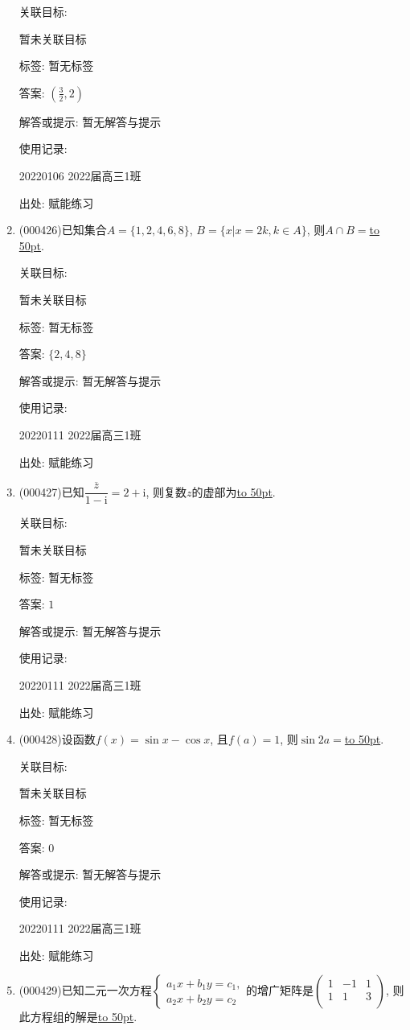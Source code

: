 \documentclass[10pt,a4paper]{article}
\newcommand{\blank}[1]{\underline{\hbox to #1pt{}}}
\begin{document}
\begin{enumerate}[1.]
关联目标:

暂未关联目标



标签: 暂无标签

答案: $(\frac 32,2)$

解答或提示: 暂无解答与提示

使用记录:

20220106	2022届高三1班	


出处: 赋能练习
\item { (000426)}已知集合$A=\{1,2,4,6,8\}$, $B=\{x|x=2k,k\in A\}$, 则$A\cap B=$\blank{50}.


关联目标:

暂未关联目标



标签: 暂无标签

答案: $\{2,4,8\}$

解答或提示: 暂无解答与提示

使用记录:

20220111	2022届高三1班	


出处: 赋能练习
\item { (000427)}已知$\dfrac{\overline z}{1-\mathrm{i}}=2+\mathrm{i}$, 则复数$z$的虚部为\blank{50}.


关联目标:

暂未关联目标



标签: 暂无标签

答案: $1$

解答或提示: 暂无解答与提示

使用记录:

20220111	2022届高三1班	


出处: 赋能练习
\item { (000428)}设函数$f(x)=\sin x-\cos x$, 且$f(a)=1$, 则$\sin 2a=$\blank{50}.


关联目标:

暂未关联目标



标签: 暂无标签

答案: $0$

解答或提示: 暂无解答与提示

使用记录:

20220111	2022届高三1班	


出处: 赋能练习
\item { (000429)}已知二元一次方程$\begin{cases} {a_1}x+{b_1}y={c_1}, \\  {a_2}x+{b_2}y={c_2} \end{cases}$的增广矩阵是$\begin{pmatrix} 1 & -1 & 1 \\  1 & 1 & 3 \\ \end{pmatrix}$, 则此方程组的解是\blank{50}.



\end{enumerate}
\end{document}

